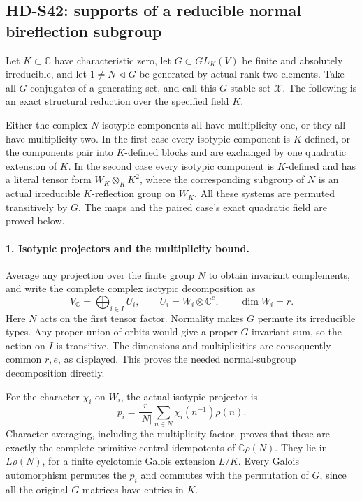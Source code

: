 \subsection{HD-S42: supports of a reducible normal bireflection subgroup}
\label{sec:reducible-bireflection-support}

Let \(K\subset\mathbb C\) have characteristic zero,
let \(G\subset GL_K(V)\) be finite and absolutely
irreducible, and let \(1\ne N\triangleleft G\) be
generated by actual rank-two elements. Take all
\(G\)-conjugates of a generating set, and call this
\(G\)-stable set \(\mathcal X\). The following is an
exact structural reduction over the specified field \(K\).

Either the complex \(N\)-isotypic components all have
multiplicity one, or they all have multiplicity two. In the
first case every isotypic component is \(K\)-defined, or
the components pair into \(K\)-defined blocks and are
exchanged by one quadratic extension of \(K\). In the
second case every isotypic component is \(K\)-defined
and has a literal tensor form \(W_K\otimes_K K^2\),
where the corresponding subgroup of \(N\) is an actual
irreducible \(K\)-reflection group on \(W_K\).
All these systems are permuted transitively by \(G\).
The maps and the paired case's exact quadratic field are
proved below.

\paragraph{1. Isotypic projectors and the multiplicity bound.}
Average any projection over the finite group \(N\) to obtain
invariant complements, and write the complete complex
isotypic decomposition as
\[
 V_{\mathbb C}=\bigoplus_{i\in I}U_i,
       \qquad U_i=W_i\otimes\mathbb C^e,
       \qquad \dim W_i=r.                                  \tag{S42.1}
\]
Here \(N\) acts on the first tensor factor. Normality
makes \(G\) permute its irreducible types. Any proper
union of orbits would give a proper \(G\)-invariant sum,
so the action on \(I\) is transitive. The dimensions
and multiplicities are consequently common \(r,e\),
as displayed. This proves the needed normal-subgroup
decomposition directly.

For the character \(\chi_i\) on \(W_i\), the actual
isotypic projector is
\[
      p_i=\frac r{|N|}\sum_{n\in N}
                       \chi_i(n^{-1})\rho(n).              \tag{S42.2}
\]
Character averaging, including the multiplicity factor,
proves that these are exactly the complete primitive central
idempotents of \(\mathbb C\rho(N)\). They lie in
\(L\rho(N)\), for a finite cyclotomic Galois extension
\(L/K\). Every Galois automorphism permutes the \(p_i\)
and commutes with the permutation of \(G\), since all
the original \(G\)-matrices have entries in \(K\).

